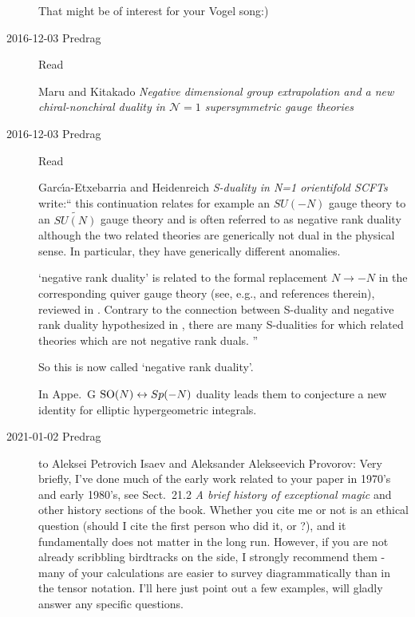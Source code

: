 \begin{description}
That might be of interest for your Vogel song:)

\item[2016-12-03 Predrag]
Read

Maru and Kitakado
{\em Negative dimensional group extrapolation and a new chiral-nonchiral
duality in ${\mathcal N} = 1$ supersymmetric gauge theories}

\item[2016-12-03 Predrag]
Read

Garc{\'{\i}}a-Etxebarria and Heidenreich
{\em S-duality in N=1 orientifold {SCFTs}} write:``
this continuation relates for example an $SU(-N)$ gauge theory to an
$\tilde{SU(N)}$ gauge theory and is often referred to as negative rank duality
although the two related theories are generically not dual in the physical
sense. In particular, they have generically different anomalies.

`negative rank duality' is related to the formal replacement $N \to -N$ in the
corresponding quiver gauge theory (see, e.g.,  and references
therein), reviewed in . Contrary to the connection between
S-duality and negative rank duality hypothesized in ,
there are many S-dualities for which related theories which are not negative
rank duals.
''

So this is now called `negative rank duality'.

In Appe.~G $\textrm{SO}(N) \leftrightarrow Sp(-N)$ duality leads them to conjecture
a new identity for elliptic hypergeometric integrals.

\item[2021-01-02 Predrag] to
{Aleksei Petrovich Isaev} and
Aleksander Alekseevich Provorov:
 Very briefly, I've done much of the early work related to
your paper in 1970's and early 1980's, see 
{Sect.~21.2} {\em A brief history of exceptional magic} and other
history sections of the book. Whether you cite me or not is an
ethical question (should I cite
{the first person who did it}, or ?),
and it fundamentally does not matter in the long run.
However, if you are not already scribbling birdtracks on the side, I
strongly recommend them - many of your calculations are easier to survey
diagrammatically than in the tensor notation. I'll here just point out a
few examples, will gladly answer any specific questions.


\end{description}
